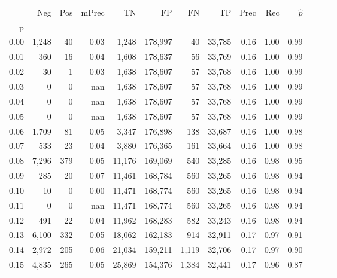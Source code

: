 \begin{tabular}{rrrrrrrrrrrrrr}
\toprule
{} &     Neg &    Pos & mPrec &       TN &       FP &      FN &      TP &  Prec &   Rec & $\hat{p}$ \\
p    &         &        &       &          &          &         &         &       &       &           \\
\midrule
0.00 &   1,248 &     40 &  0.03 &    1,248 &  178,997 &      40 &  33,785 &  0.16 &  1.00 &      0.99 \\
0.01 &     360 &     16 &  0.04 &    1,608 &  178,637 &      56 &  33,769 &  0.16 &  1.00 &      0.99 \\
0.02 &      30 &      1 &  0.03 &    1,638 &  178,607 &      57 &  33,768 &  0.16 &  1.00 &      0.99 \\
0.03 &       0 &      0 &   nan &    1,638 &  178,607 &      57 &  33,768 &  0.16 &  1.00 &      0.99 \\
0.04 &       0 &      0 &   nan &    1,638 &  178,607 &      57 &  33,768 &  0.16 &  1.00 &      0.99 \\
0.05 &       0 &      0 &   nan &    1,638 &  178,607 &      57 &  33,768 &  0.16 &  1.00 &      0.99 \\
0.06 &   1,709 &     81 &  0.05 &    3,347 &  176,898 &     138 &  33,687 &  0.16 &  1.00 &      0.98 \\
0.07 &     533 &     23 &  0.04 &    3,880 &  176,365 &     161 &  33,664 &  0.16 &  1.00 &      0.98 \\
0.08 &   7,296 &    379 &  0.05 &   11,176 &  169,069 &     540 &  33,285 &  0.16 &  0.98 &      0.95 \\
0.09 &     285 &     20 &  0.07 &   11,461 &  168,784 &     560 &  33,265 &  0.16 &  0.98 &      0.94 \\
0.10 &      10 &      0 &  0.00 &   11,471 &  168,774 &     560 &  33,265 &  0.16 &  0.98 &      0.94 \\
0.11 &       0 &      0 &   nan &   11,471 &  168,774 &     560 &  33,265 &  0.16 &  0.98 &      0.94 \\
0.12 &     491 &     22 &  0.04 &   11,962 &  168,283 &     582 &  33,243 &  0.16 &  0.98 &      0.94 \\
0.13 &   6,100 &    332 &  0.05 &   18,062 &  162,183 &     914 &  32,911 &  0.17 &  0.97 &      0.91 \\
0.14 &   2,972 &    205 &  0.06 &   21,034 &  159,211 &   1,119 &  32,706 &  0.17 &  0.97 &      0.90 \\
0.15 &   4,835 &    265 &  0.05 &   25,869 &  154,376 &   1,384 &  32,441 &  0.17 &  0.96 &      0.87 \\

\end{tabular}
